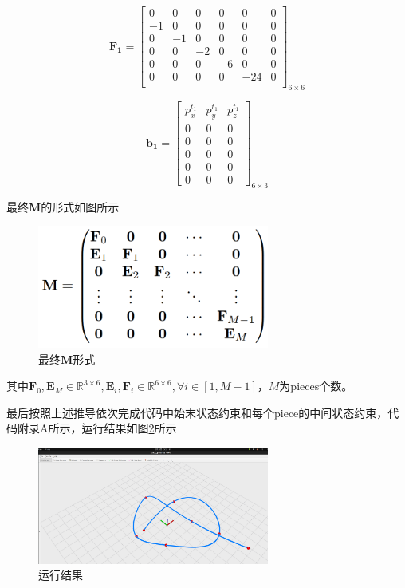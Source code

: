 \documentclass[40pt,a4paper,UTF8,twocolumn]{ctexart}%
\numberwithin{equation}{section}
\begin{document}
\begin{enumerate}
\begin{equation}
    \bm {F_1} = 
    \begin{bmatrix}
          0&0&0&0&0&0\\
         -1&0&0&0&0&0\\
         0&-1&0&0&0&0\\
         0&0&-2&0&0&0\\
         0&0&0&-6&0&0\\
         0&0&0&0&-24&0\\
    \end{bmatrix}_{6\times 6}
\end{equation}

\begin{equation}
    \bm {b_1} = 
    \begin{bmatrix}
        p^{t_1}_x & p^{t_1}_y & p^{t_1}_z \\
        0&0&0 \\
        0&0&0 \\
        0&0&0 \\
        0&0&0 \\
        0&0&0
    \end{bmatrix}_{6\times 3}
\end{equation}
\end{enumerate}

最终$\bm M$的形式如图所示
\begin{figure}[H]
    \centering
    \includegraphics[width=3.0in]{ch5_3.png} 
    \caption{最终$\bm M$形式}
    \label{fig3} %
\end{figure}
其中$\bm F_0,\bm E_M\in \mathbb{R}^{3\times 6},\bm E_i,\bm F_i\in \mathbb{R}^{6\times 6},\forall i\in [1,M-1]$，$M$为pieces个数。

最后按照上述推导依次完成代码中始末状态约束和每个piece的中间状态约束，代码附录A所示，运行结果如图\ref{fig4}所示
\begin{figure}[H]
    \centering
    \includegraphics[width=3.0in]{ch5_4.png} 
    \caption{运行结果}
    \label{fig4} %
\end{figure}
\end{document}
